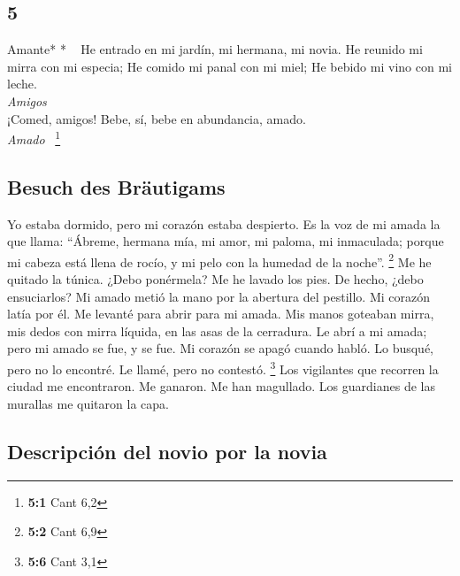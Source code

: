 \begin{paracol}{2}
\hypertarget{section-8}{%
\section{5}\label{section-8}}

\emph{\hfill\break
}Amante* * ~ He entrado en mi jardín, mi hermana, mi
novia. He reunido mi mirra con mi especia; He comido mi panal con mi
miel; He bebido mi vino con mi leche.\\
\emph{Amigos}\\
¡Comed, amigos! Bebe, sí, bebe en abundancia, amado.\\
\emph{Amado} ~\footnote{\textbf{5:1} Cant 6,2}

\hypertarget{besuch-des-bruxe4utigams}{%
\subsection{Besuch des Bräutigams}\label{besuch-des-bruxe4utigams}}

 Yo estaba dormido, pero mi corazón estaba despierto. Es
la voz de mi amada la que llama: ``Ábreme, hermana mía, mi amor, mi
paloma, mi inmaculada; porque mi cabeza está llena de rocío, y mi pelo
con la humedad de la noche''. \footnote{\textbf{5:2} Cant 6,9}
 Me he quitado la túnica. ¿Debo ponérmela? Me he lavado
los pies. De hecho, ¿debo ensuciarlos?  Mi amado metió la
mano por la abertura del pestillo. Mi corazón latía por él.
 Me levanté para abrir para mi amada. Mis manos goteaban
mirra, mis dedos con mirra líquida, en las asas de la cerradura.
 Le abrí a mi amada; pero mi amado se fue, y se fue. Mi
corazón se apagó cuando habló. Lo busqué, pero no lo encontré. Le llamé,
pero no contestó. \footnote{\textbf{5:6} Cant 3,1}  Los
vigilantes que recorren la ciudad me encontraron. Me ganaron. Me han
magullado. Los guardianes de las murallas me quitaron la capa.

\hypertarget{descripciuxf3n-del-novio-por-la-novia}{%
\subsection{Descripción del novio por la
novia}\label{descripciuxf3n-del-novio-por-la-novia}}


\end{paracol}
